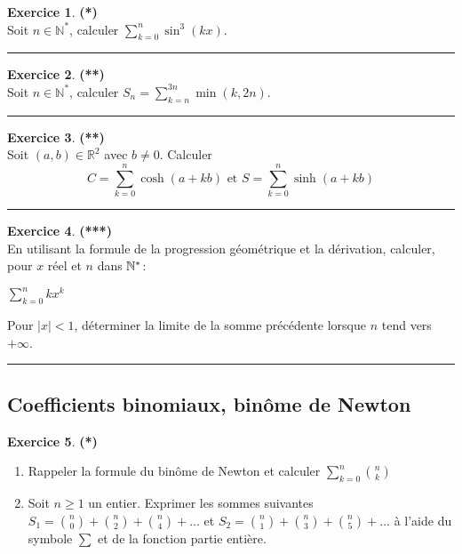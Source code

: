 \documentclass[a4paper,11pt]{article}
\theoremstyle{definition}
\newtheorem{exo}{Exercice} %
\begin{document}
\raggedright

\begin{minipage}[t]{1\linewidth}
	\begin{minipage}[t]{0.48\linewidth}
		\raggedright
		
		\begin{exo}\textbf{(*)}\quad\\[0.2cm]
			Soit $n \in \mathbb{N}^{*}$,
			calculer $\displaystyle\sum_{k=0}^{n}{\sin^{3}(kx)}$.
			
			\centering
			\rule{1\linewidth}{0.6pt}
		\end{exo}
	
			\begin{exo}\textbf{(**)}\quad\\[0.2cm]
		Soit $n \in \mathbb{N}^{*}$, calculer $S_n=\sum\limits_{k=n}^{3n}\min(k,2n)$.
		
		\centering
		\rule{1\linewidth}{0.6pt}
	\end{exo}
		
		
		
		\begin{exo}\textbf{(**)}\quad\\[0.2cm]
			Soit $(a,b) \in \mathbb{R}^2$ avec $b \neq 0$. Calculer
			$$ C = \displaystyle\sum_{k=0}^{n}{\cosh(a+kb)} \text{ et } S = \displaystyle\sum_{k=0}^{n}{\sinh(a+kb)}$$
			
			\centering
			\rule{1\linewidth}{0.6pt}
		\end{exo}
	

			\begin{exo}\textbf{(***)}\quad\\[0.2cm]
		En utilisant la formule de la progression géométrique et la
		dérivation, calculer, pour $x$ réel et $n$ dans $\mathbb{N}^*$:
	
		\centering$\displaystyle\sum_{k=0}^{n}kx^k$
		
		\raggedright Pour $|x| < 1$, déterminer la limite de la somme
		précédente lorsque $n$ tend vers $+\infty$.
		
		\centering
		\rule{1\linewidth}{0.6pt}
	\end{exo}

		
		\subsection*{Coefficients binomiaux, binôme de Newton}	
		\begin{exo}\textbf{(*)}\quad\\[0.2cm]
			\begin{enumerate}
				\item Rappeler la formule du binôme de Newton et calculer $\sum_{k=0}^{n}\binom{n}{k}$
				\item Soit $n\geq1$ un entier. Exprimer les sommes suivantes $S_1 = \binom{n}{0}+\binom{n}{2}+\binom{n}{4}+...$ et $S_2 = \binom{n}{1}+\binom{n}{3}+\binom{n}{5}+...$ à l'aide du symbole $\sum$ et de la fonction partie entière.
				

\end{enumerate}
\end{exo}
\end{minipage}
\end{minipage}
\end{document}
